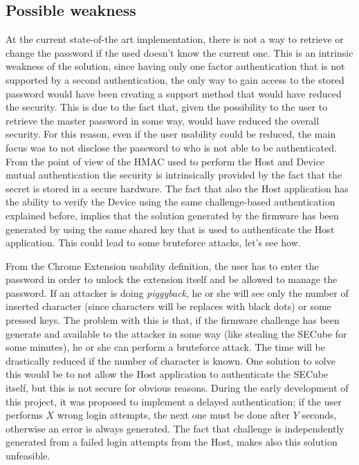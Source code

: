 \subsection{Possible weakness}
\label{sec:weakness}
At the current state-of-the art implementation, there is not a way to retrieve or change the password if the used doesn't know the current one. This is an intrinsic weakness of the solution, since having only one factor authentication that is not supported by a second authentication, the only way to gain access to the stored password would have been creating a support method that would have reduced the security. This is due to the fact that, given the possibility to the user to retrieve the master password in some way, would have reduced the overall security. For this reason, even if the user usability could be reduced, the main focus was to not disclose the password to who is not able to be authenticated.\newline\newline
From the point of view of the HMAC used to perform the Host and Device mutual authentication the security is intrinsically provided by the fact that the secret is stored in a secure hardware. The fact that also the Host application has the ability to verify the Device using the same challenge-based authentication explained before, implies that the solution generated by the firmware has been generated by using the same shared key that is used to authenticate the Host application. This could lead to some bruteforce attacks, let's see how.

From the Chrome Extension usability definition, the user has to enter the password in order to unlock the extension itself and be allowed to manage the password. If an attacker is doing \textit{piggyback}, he or she will see only the number of inserted character (since characters will be replaces with black dots) or some pressed keys. The problem with this is that, if the firmware challenge has been generate and available to the attacker in some way (like stealing the SECube for some minutes), he or she can perform a bruteforce attack. The time will be drastically reduced if the number of character is known. One solution to solve this would be to not allow the Host application to authenticate the SECube itself, but this is not secure for obvious reasons. 
During the early development of this project, it was proposed to implement a delayed authentication; if the user performs $X$ wrong login attempts, the next one must be done after $Y$ seconds, otherwise an error is always generated. The fact that challenge is independently generated from a failed login attempts from the Host, makes also this solution unfeasible.

